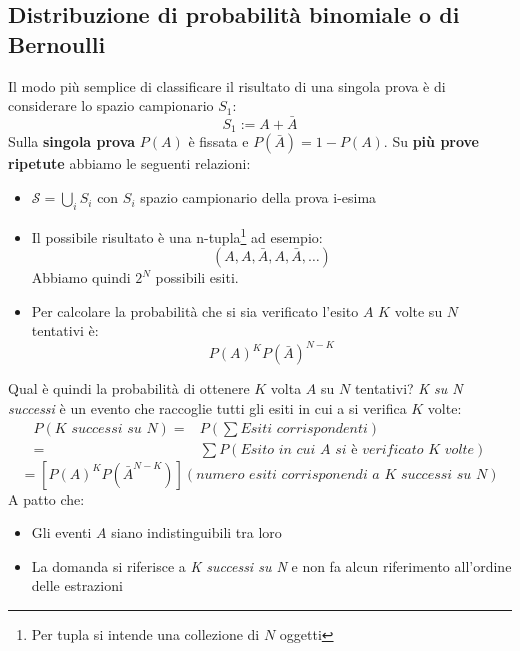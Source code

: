 \documentclass[11pt,a4paper]{book}
\begin{document}
\subsection{Distribuzione di probabilità binomiale o di Bernoulli}  
Il modo più semplice di classificare il risultato di una singola prova è di considerare lo spazio campionario $ S_1 $:
\begin{equation}
S_1 := A+ \bar{A}
\end{equation}
Sulla \textbf{singola prova} $ P(A) $ è fissata e $ P(\bar{A})=1-P(A) $. Su \textbf{più prove ripetute} abbiamo le seguenti relazioni:
\begin{itemize}
\item $ \mathcal{S}  =  \bigcup\limits_i S_i$ con $ S_i $ spazio campionario della prova i-esima
\item Il possibile risultato è una n-tupla\footnote{Per tupla si intende una collezione di $ N $ oggetti} ad esempio:
\begin{equation}
(A,A,\bar{A}, A ,\bar{A}, \dots)
\end{equation}
Abbiamo quindi $ 2^N $ possibili esiti.
\item Per calcolare la probabilità che si sia verificato l'esito $ A $ $ K $ volte su $ N $ tentativi è:
\begin{equation}
P(A)^K P(\bar{A})^{N-K}
\end{equation}
\end{itemize}
Qual è quindi la probabilità di ottenere $ K $ volta $ A $ su $ N $ tentativi? \textit{K su N successi} è un evento che raccoglie tutti gli esiti in cui a si verifica $ K $ volte:
\begin{align}
P(\textit{K successi su N}) =& P \left( \sum\textit{Esiti corrispondenti}\right) \\
=& \sum P(\textit{Esito in cui A si è verificato K volte})
\end{align}
\begin{equation}
= [P(A)^KP(\bar{A}^{N-K})](\textit{numero esiti corrisponendi a K successi su N})
\end{equation}
A patto che:
\begin{itemize}
\item Gli eventi $ A $ siano indistinguibili tra loro
\item La domanda si riferisce a \textit{K successi su N} e non fa alcun riferimento all'ordine delle estrazioni
\end{itemize}
\end{document}
